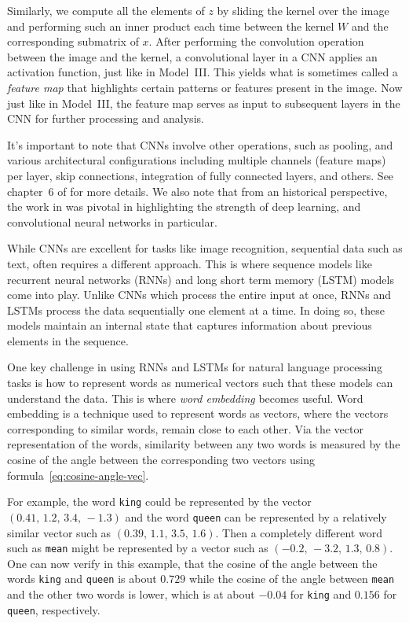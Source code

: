\documentclass[12pt]{article}
\begin{document}
Similarly, we compute all the elements of $z$ by sliding the kernel over the image and performing such an inner product each time between the kernel $W$ and the corresponding submatrix of $x$. After performing the convolution operation between the image and the kernel, a convolutional layer in a CNN applies an activation function, just like in Model~III. This yields what is sometimes called a {\em feature map} that highlights certain patterns or features present in the image. Now just like in Model~III, the feature map serves as input to subsequent layers in the CNN for further processing and analysis.

It's important to note that CNNs involve other operations, such as pooling, and various architectural configurations including multiple channels (feature maps) per layer, skip connections, integration of fully connected layers, and others. See chapter~6 of \cite{LiquetMokaNazarathy2024DeepLearning} for more details. We also note that from an historical perspective, the work in \cite{krizhevsky2012imagenetxxxqqq} was pivotal in highlighting the strength of deep learning, and convolutional neural networks in particular.

While CNNs are excellent for tasks like image recognition, sequential data such as text, often requires a different approach. This is where sequence models like recurrent neural networks (RNNs) and long short term memory (LSTM) models come into play. Unlike CNNs which process the entire input at once, RNNs and LSTMs process the data sequentially one element at a time. In doing so, these models maintain an internal state that captures information about previous elements in the sequence.

One key challenge in using RNNs and LSTMs for natural language processing tasks is how to represent words as numerical vectors such that these models can understand the data. This is where {\em word embedding} becomes useful. Word embedding is a technique used to represent words as vectors, where the vectors corresponding to similar words, remain close to each other. Via the vector representation of the words, similarity between any two words is measured by the cosine of the angle between the corresponding two vectors using formula~\eqref{eq:cosine-angle-vec}.  

For example, the word \texttt{king} could be represented by the vector $(0.41, \, 1.2,\, 3.4, \,-1.3)$ and the word \texttt{queen} can be represented by a relatively similar vector such as $(0.39, \, 1.1, \, 3.5, \, 1.6)$. Then a completely different word such as \texttt{mean} might be represented by a vector such as $(-0.2,\, -3.2,\, 1.3,\, 0.8)$. One can now verify in this example, that the cosine of the angle between the words \texttt{king} and \texttt{queen} is about $0.729$ while the cosine of the angle between \texttt{mean} and the other two words is lower, which is at about $-0.04$ for \texttt{king} and $0.156$ for \texttt{queen}, respectively. 
\end{document}
